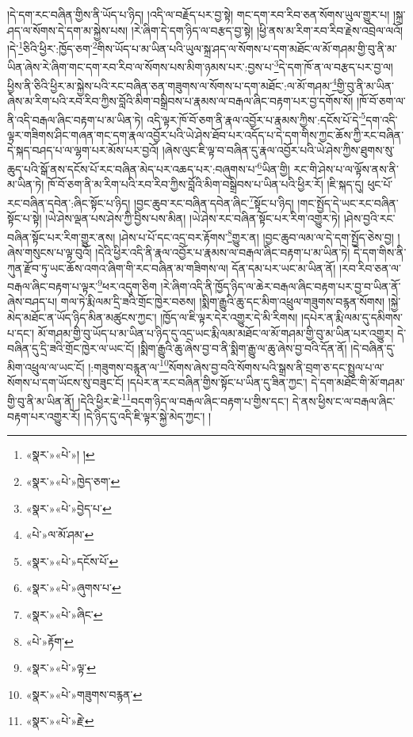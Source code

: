 །དེ་དག་རང་བཞིན་གྱིས་ནི་ཡོད་པ་ཉིད། །འདི་ལ་བརྗོད་པར་བྱ་སྟེ། གང་དག་རབ་རིབ་ཅན་སོགས་ཡུལ་གྱུར་པ། །སྐྲ་ཤད་ལ་སོགས་དེ་དག་མ་སྐྱེས་པས། །རེ་ཞིག་དེ་དག་ཉིད་ལ་བརྩད་བྱ་སྟེ། །ཕྱི་ནས་མ་རིག་རབ་རིབ་རྗེས་འབྲེལ་ལའོ། །དེ་\footnote{«སྣར་»«པེ་»། །}ཅིའི་ཕྱིར་:ཁྱོད་ཅག་\footnote{«སྣར་»«པེ་»ཁྱེད་ཅག་}གིས་ཡོད་པ་མ་ཡིན་པའི་ཡུལ་སྐྲ་ཤད་ལ་སོགས་པ་དག་མཐོང་ལ་མོ་གཤམ་གྱི་བུ་ནི་མ་ཡིན་ཞེས་རེ་ཞིག་གང་དག་རབ་རིབ་ལ་སོགས་པས་མིག་ཉམས་པར་:བྱས་པ་\footnote{«སྣར་»«པེ་»བྱེད་པ་}དེ་དག་ཁོ་ན་ལ་བརྩད་པར་བྱ་ལ། ཕྱིས་ནི་ཅིའི་ཕྱིར་མ་སྐྱེས་པའི་རང་བཞིན་ཅན་གཟུགས་ལ་སོགས་པ་དག་མཐོང་:ལ་མོ་གཤམ་\footnote{«པེ་»ལ་མོ་ཤམ་}གྱི་བུ་ནི་མ་ཡིན་ཞེས་མ་རིག་པའི་རབ་རིབ་ཀྱིས་བློའི་མིག་བསྒྲིབས་པ་རྣམས་ལ་བརྒལ་ཞིང་བརྟག་པར་བྱ་དགོས་སོ། །ཁོ་བོ་ཅག་ལ་ནི་འདི་བརྒལ་ཞིང་བརྟག་པ་མ་ཡིན་ཏེ། འདི་ལྟར་ཁོ་བོ་ཅག་ནི་རྣལ་འབྱོར་པ་རྣམས་ཀྱིས་:དངོས་པོ་དེ་\footnote{«སྣར་»«པེ་»དངོས་པོ་}དག་འདི་ལྟར་གཟིགས་ཤིང་གཞན་གང་དག་རྣལ་འབྱོར་པའི་ཡེ་ཤེས་ཐོབ་པར་འདོད་པ་དེ་དག་གིས་ཀྱང་ཆོས་ཀྱི་རང་བཞིན་དེ་སྐད་བཤད་པ་ལ་ལྷག་པར་མོས་པར་བྱའོ། །ཞེས་ལུང་ཇི་ལྟ་བ་བཞིན་དུ་རྣལ་འབྱོར་པའི་ཡེ་ཤེས་ཀྱིས་ཐུགས་སུ་ཆུད་པའི་སྒོ་ནས་དངོས་པོ་རང་བཞིན་མེད་པར་འཆད་པར་:བཞུགས་པ་\footnote{«སྣར་»«པེ་»ཞུགས་པ་}ཡིན་གྱི། རང་གི་ཤེས་པ་ལ་ལྟོས་ནས་ནི་མ་ཡིན་ཏེ། ཁོ་བོ་ཅག་ནི་མ་རིག་པའི་རབ་རིབ་ཀྱིས་བློའི་མིག་བསྒྲིབས་པ་ཡིན་པའི་ཕྱིར་རོ། །ཇི་སྐད་དུ། ཕུང་པོ་རང་བཞིན་དབེན་:ཞིང་སྟོང་པ་ཉིད། །བྱང་ཆུབ་རང་བཞིན་དབེན་ཞིང་\footnote{«སྣར་»«པེ་»ཞིང་}སྟོང་པ་ཉིད། །གང་སྤྱོད་དེ་ཡང་རང་བཞིན་སྟོང་པ་སྟེ། །ཡེ་ཤེས་ལྡན་པས་ཤེས་ཀྱི་བྱིས་པས་མིན། །ཡེ་ཤེས་རང་བཞིན་སྟོང་པར་རིག་འགྱུར་ཏེ། །ཤེས་བྱའི་རང་བཞིན་སྟོང་པར་རིག་གྱུར་ནས། །ཤེས་པ་པོ་དང་འདྲ་བར་རྟོགས་\footnote{«པེ་»རྟོག་}གྱུར་ན། །བྱང་ཆུབ་ལམ་ལ་དེ་དག་སྤྱོད་ཅེས་བྱ། །ཞེས་གསུངས་པ་ལྟ་བུའོ། །དེའི་ཕྱིར་འདི་ནི་རྣལ་འབྱོར་པ་རྣམས་ལ་བརྒལ་ཞིང་བརྟག་པ་མ་ཡིན་ཏེ། དེ་དག་གིས་ནི་ཀུན་རྫོབ་ཏུ་ཡང་ཆོས་འགའ་ཞིག་གི་རང་བཞིན་མ་གཟིགས་ལ། དོན་དམ་པར་ཡང་མ་ཡིན་ནོ། །རབ་རིབ་ཅན་ལ་བརྒལ་ཞིང་བརྟག་པ་ལྟར་\footnote{«སྣར་»«པེ་»ལྟ་}ཕར་འདུག་ཅིག །རེ་ཞིག་འདི་ནི་ཁྱོད་ཉིད་ལ་ཆེར་བརྒལ་ཞིང་བརྟག་པར་བྱ་བ་ཡིན་ནོ་ཞེས་བཤད་པ། གལ་ཏེ་རྨི་ལམ་དྲི་ཟའི་གྲོང་ཁྱེར་བཅས། །སྨིག་རྒྱུའི་ཆུ་དང་མིག་འཕྲུལ་གཟུགས་བརྙན་སོགས། །སྐྱེ་མེད་མཐོང་ན་ཡོད་ཉིད་མིན་མཚུངས་ཀྱང་། །ཁྱོད་ལ་ཇི་ལྟར་དེར་འགྱུར་དེ་མི་རིགས། །དཔེར་ན་རྨི་ལམ་དུ་དམིགས་པ་དང་། མོ་གཤམ་གྱི་བུ་ཡོད་པ་མ་ཡིན་པ་ཉིད་དུ་འདྲ་ཡང་རྨི་ལམ་མཐོང་ལ་མོ་གཤམ་གྱི་བུ་མ་ཡིན་པར་འགྱུར། དེ་བཞིན་དུ་དྲི་ཟའི་གྲོང་ཁྱེར་ལ་ཡང་ངོ། །སྨིག་རྒྱུའི་ཆུ་ཞེས་བྱ་བ་ནི་སྨིག་རྒྱུ་ལ་ཆུ་ཞེས་བྱ་བའི་དོན་ནོ། །དེ་བཞིན་དུ་མིག་འཕྲུལ་ལ་ཡང་ངོ། །:གཟུགས་བརྙན་ལ་\footnote{«སྣར་»«པེ་»གཟུགས་བརྙན་}སོགས་ཞེས་བྱ་བའི་སོགས་པའི་སྒྲས་ནི་བྲག་ཅ་དང་སྤྲུལ་པ་ལ་སོགས་པ་དག་ཡོངས་སུ་བཟུང་ངོ། །དཔེར་ན་རང་བཞིན་གྱིས་སྟོང་པ་ཡིན་དུ་ཟིན་ཀྱང་། དེ་དག་མཐོང་གི་མོ་གཤམ་གྱི་བུ་ནི་མ་ཡིན་ནོ། །དེའི་ཕྱིར་ཇེ་\footnote{«སྣར་»«པེ་»རྗེ་}བདག་ཉིད་ལ་བརྒལ་ཞིང་བརྟག་པ་གྱིས་དང་། དེ་ནས་ཕྱིས་ང་ལ་བརྒལ་ཞིང་བརྟག་པར་འགྱུར་རོ། །དེ་ཉིད་དུ་འདི་ཇི་ལྟར་སྐྱེ་མེད་ཀྱང་། །
